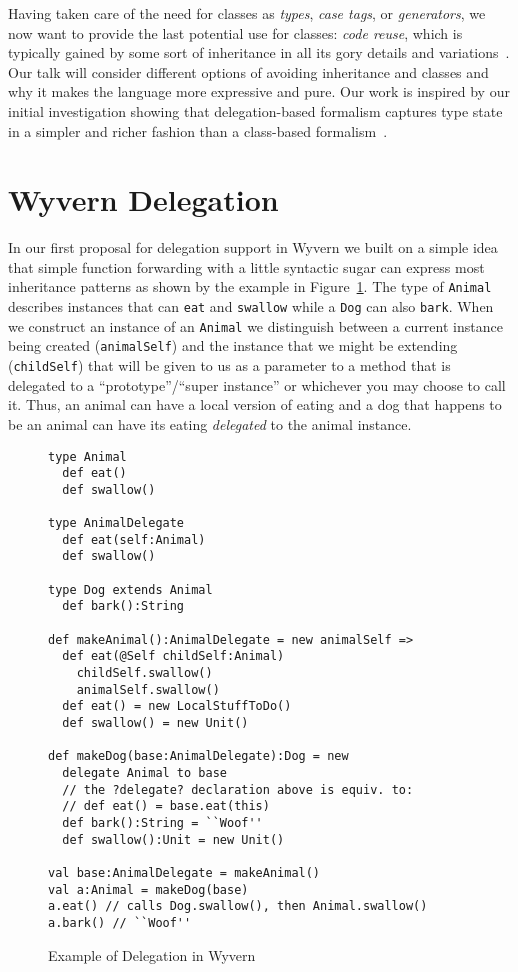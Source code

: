 \documentclass[preprint]{sigplanconf}
\begin{document}
Having taken care of the need for classes as \textit{types}, \textit{case tags}, or \textit{generators}, we now want to provide the last potential use for classes: \textit{code reuse}, which is typically gained by some sort of inheritance in all its gory details and variations~\cite{jones:2016:inheritance}. Our talk will consider different options of avoiding inheritance and classes and why it makes the language more expressive and pure. Our work is inspired by our initial investigation showing that delegation-based formalism captures type state in a simpler and richer fashion than a class-based formalism~\cite{li:2015:ftfjp-typestate}.

\section{Wyvern Delegation}

In our first proposal for delegation support in Wyvern we built on a simple idea that simple function forwarding with a little syntactic sugar can express most inheritance patterns as shown by the example in Figure~\ref{f:wyvern-delegation}. The type of \texttt{Animal} describes instances that can \texttt{eat} and \texttt{swallow} while a \texttt{Dog} can also \texttt{bark}. When we construct an instance of an \texttt{Animal} we distinguish between a current instance being created (\texttt{animalSelf}) and the instance that we might be extending (\texttt{childSelf}) that will be given to us as a parameter to a method that is delegated to a ``prototype''/``super instance'' or whichever you may choose to call it. Thus, an animal can have a local version of eating and a dog that happens to be an animal can have its eating \textit{delegated} to the animal instance.

\begin{figure}
\begin{lstlisting}
type Animal
  def eat()
  def swallow()

type AnimalDelegate
  def eat(self:Animal)
  def swallow()

type Dog extends Animal
  def bark():String

def makeAnimal():AnimalDelegate = new animalSelf =>
  def eat(@Self childSelf:Animal)
    childSelf.swallow()
    animalSelf.swallow()
  def eat() = new LocalStuffToDo()
  def swallow() = new Unit()

def makeDog(base:AnimalDelegate):Dog = new
  delegate Animal to base
  // the ?delegate? declaration above is equiv. to:
  // def eat() = base.eat(this)
  def bark():String = ``Woof''
  def swallow():Unit = new Unit()

val base:AnimalDelegate = makeAnimal()
val a:Animal = makeDog(base)
a.eat() // calls Dog.swallow(), then Animal.swallow()
a.bark() // ``Woof''
\end{lstlisting}
\caption{Example of Delegation in Wyvern}
\label{f:wyvern-delegation}
\end{figure}
\end{document}
